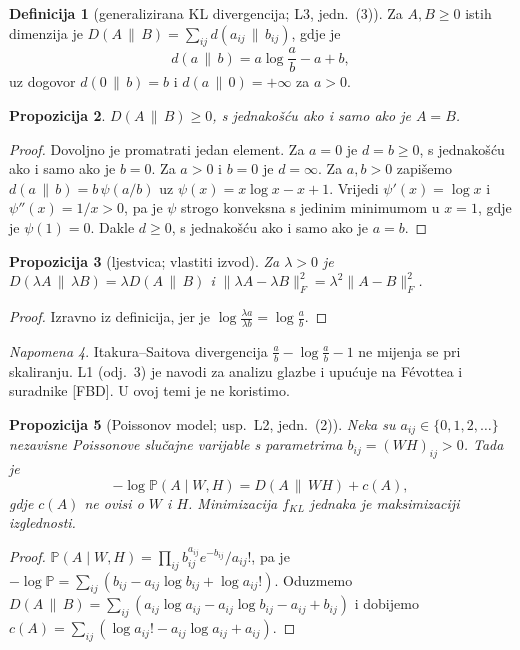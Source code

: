 \documentclass[11pt,a4paper]{article}
\theoremstyle{definition}
\newtheorem{definicija}{Definicija}[section]
\theoremstyle{plain}
\newtheorem{propozicija}[definicija]{Propozicija}
\theoremstyle{remark}
\newtheorem{napomena}[definicija]{Napomena}
\newcommand{\Dkl}[2]{D(#1\,\|\,#2)}
\newcommand{\dkl}[2]{d(#1\,\|\,#2)}
\begin{document}
\begin{definicija}[generalizirana KL divergencija; L3, jedn.~(3)]
Za $A,B\geq0$ istih dimenzija je $\Dkl{A}{B}=\sum_{ij}\dkl{a_{ij}}{b_{ij}}$, gdje je
\[
  \dkl{a}{b}=a\log\frac ab-a+b,
\]
uz dogovor $\dkl{0}{b}=b$ i $\dkl{a}{0}=+\infty$ za $a>0$.
\end{definicija}

\begin{propozicija}\label{prop:kl-nenegativna}
$\Dkl{A}{B}\geq0$, s jednakošću ako i samo ako je $A=B$.
\end{propozicija}
\begin{proof}
Dovoljno je promatrati jedan element. Za $a=0$ je $d=b\geq0$, s jednakošću ako i samo ako je
$b=0$. Za $a>0$ i $b=0$ je $d=\infty$. Za $a,b>0$ zapišemo $\dkl ab=b\,\psi(a/b)$ uz
$\psi(x)=x\log x-x+1$. Vrijedi $\psi'(x)=\log x$ i $\psi''(x)=1/x>0$, pa je $\psi$ strogo konveksna s
jedinim minimumom u $x=1$, gdje je $\psi(1)=0$. Dakle $d\geq0$, s jednakošću ako i samo ako je $a=b$.
\end{proof}

\begin{propozicija}[ljestvica; vlastiti izvod]\label{prop:ljestvica}
Za $\lambda>0$ je $\Dkl{\lambda A}{\lambda B}=\lambda\Dkl AB$ i $\|\lambda A-\lambda B\|_F^2=\lambda^2\|A-B\|_F^2$.
\end{propozicija}
\begin{proof}
Izravno iz definicija, jer je $\log\frac{\lambda a}{\lambda b}=\log\frac ab$.
\end{proof}

\begin{napomena}
Itakura–Saitova divergencija $\frac ab-\log\frac ab-1$ ne mijenja se pri skaliranju. L1 (odj.~3) je
navodi za analizu glazbe i upućuje na Févottea i suradnike [FBD]. U ovoj temi je ne koristimo.
\end{napomena}

\begin{propozicija}[Poissonov model; usp.\ L2, jedn.~(2)]\label{prop:poisson}
Neka su $a_{ij}\in\{0,1,2,\dots\}$ nezavisne Poissonove slučajne varijable s parametrima
$b_{ij}=(WH)_{ij}>0$. Tada je
\[
  -\log\mathbb{P}(A\mid W,H)=\Dkl{A}{WH}+c(A),
\]
gdje $c(A)$ ne ovisi o $W$ i $H$. Minimizacija $f_{KL}$ jednaka je maksimizaciji izglednosti.
\end{propozicija}
\begin{proof}
$\mathbb{P}(A\mid W,H)=\prod_{ij}b_{ij}^{a_{ij}}e^{-b_{ij}}/a_{ij}!$, pa je
$-\log\mathbb{P}=\sum_{ij}(b_{ij}-a_{ij}\log b_{ij}+\log a_{ij}!)$. Oduzmemo
$\Dkl AB=\sum_{ij}(a_{ij}\log a_{ij}-a_{ij}\log b_{ij}-a_{ij}+b_{ij})$ i dobijemo
$c(A)=\sum_{ij}(\log a_{ij}!-a_{ij}\log a_{ij}+a_{ij})$.
\end{proof}
\end{document}
